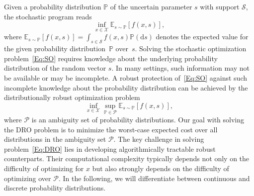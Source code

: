 \documentclass{article}
\newcommand{\mX}{\mathcal{X}}
\newcommand{\mP}{\mathcal{P}}
\newcommand{\mS}{\mathcal{S}}
\newcommand{\E}{\mathbb{E}}
\newcommand{\prob}{\mathbb{P}}
\begin{document}
Given a probability distribution \(\prob\) of the uncertain parameter
\(s\) with support \(\mS\), the stochastic program reads
\begin{equation}
	\inf_{x\in\mX} \E_{s\sim \prob} \left[f(x,s)\right],  \label{Eq:SO}\tag{SO}
\end{equation}
where \(\E_{s\sim \prob}\left[f(x,s)\right]=\int_{s\in\mS} f(x,s) \prob(\text{d}s)\) denotes the expected value for the given probability distribution~\(\prob\) over~\(s\).
Solving the stochastic optimization problem~\eqref{Eq:SO} requires knowledge about the underlying probability distribution of the random vector \(s\).
In many settings, such information may not be available or may be incomplete. 
A robust protection of~\eqref{Eq:SO} against such incomplete knowledge about the probability distribution can be achieved by the distributionally robust optimization problem
\begin{equation}
	\inf_{x\in\mX} \sup_{\prob \in \mP}  \E_{s\sim \prob} \left[f(x,s)\right],  \label{Eq:DRO}	\tag{DRO}
\end{equation}
where \(\mP\) is an ambiguity set of probability distributions.
Our goal with solving the DRO problem is to minimize the worst-case expected cost over all distributions in the ambiguity set \(\mP\). 
The key challenge in solving problem~\eqref{Eq:DRO} lies in developing
algorithmically tractable robust counterparts. Their computational
complexity typically depends not only on the difficulty of optimizing for $x$ but also 
strongly depends on the difficulty of optimizing over \(\mP\). 
In the following, we will differentiate between continuous and
discrete probability distributions.
\end{document}
